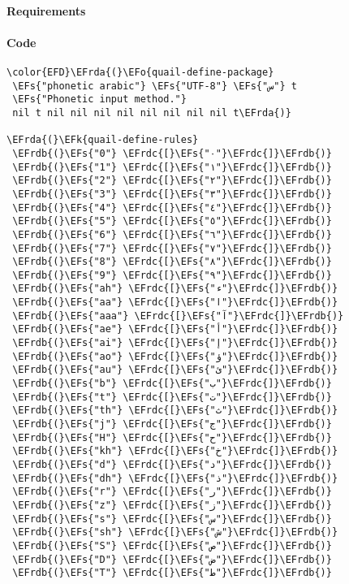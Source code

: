 \documentclass[a4wide,10pt]{article}
\newcommand{\EFs}[1]{\textcolor{EFs}{#1}} %
\newcommand{\EFk}[1]{\textcolor{EFk}{#1}} %
\newcommand{\EFo}[1]{\textcolor{EFo}{#1}} %
\newcommand{\EFrda}[1]{\textcolor{EFrda}{#1}} %
\newcommand{\EFrdb}[1]{\textcolor{EFrdb}{#1}} %
\newcommand{\EFrdc}[1]{\textcolor{EFrdc}{#1}} %
\begin{document}
\paragraph{Requirements}
\label{sec:org575892f}
\paragraph{Code}
\label{sec:org2cb51ba}
\begin{Code}
\begin{Verbatim}
\color{EFD}\EFrda{(}\EFo{quail-define-package}
 \EFs{"phonetic arabic"} \EFs{"UTF-8"} \EFs{"س"} t
 \EFs{"Phonetic input method."}
 nil t nil nil nil nil nil nil nil nil t\EFrda{)}

\EFrda{(}\EFk{quail-define-rules}
 \EFrdb{(}\EFs{"0"} \EFrdc{[}\EFs{"٠"}\EFrdc{]}\EFrdb{)}
 \EFrdb{(}\EFs{"1"} \EFrdc{[}\EFs{"١"}\EFrdc{]}\EFrdb{)}
 \EFrdb{(}\EFs{"2"} \EFrdc{[}\EFs{"٢"}\EFrdc{]}\EFrdb{)}
 \EFrdb{(}\EFs{"3"} \EFrdc{[}\EFs{"٣"}\EFrdc{]}\EFrdb{)}
 \EFrdb{(}\EFs{"4"} \EFrdc{[}\EFs{"٤"}\EFrdc{]}\EFrdb{)}
 \EFrdb{(}\EFs{"5"} \EFrdc{[}\EFs{"٥"}\EFrdc{]}\EFrdb{)}
 \EFrdb{(}\EFs{"6"} \EFrdc{[}\EFs{"٦"}\EFrdc{]}\EFrdb{)}
 \EFrdb{(}\EFs{"7"} \EFrdc{[}\EFs{"٧"}\EFrdc{]}\EFrdb{)}
 \EFrdb{(}\EFs{"8"} \EFrdc{[}\EFs{"٨"}\EFrdc{]}\EFrdb{)}
 \EFrdb{(}\EFs{"9"} \EFrdc{[}\EFs{"٩"}\EFrdc{]}\EFrdb{)}
 \EFrdb{(}\EFs{"ah"} \EFrdc{[}\EFs{"ء"}\EFrdc{]}\EFrdb{)}
 \EFrdb{(}\EFs{"aa"} \EFrdc{[}\EFs{"ا"}\EFrdc{]}\EFrdb{)}
 \EFrdb{(}\EFs{"aaa"} \EFrdc{[}\EFs{"آ"}\EFrdc{]}\EFrdb{)}
 \EFrdb{(}\EFs{"ae"} \EFrdc{[}\EFs{"أ"}\EFrdc{]}\EFrdb{)}
 \EFrdb{(}\EFs{"ai"} \EFrdc{[}\EFs{"إ"}\EFrdc{]}\EFrdb{)}
 \EFrdb{(}\EFs{"ao"} \EFrdc{[}\EFs{"ؤ"}\EFrdc{]}\EFrdb{)}
 \EFrdb{(}\EFs{"au"} \EFrdc{[}\EFs{"ئ"}\EFrdc{]}\EFrdb{)}
 \EFrdb{(}\EFs{"b"} \EFrdc{[}\EFs{"ب"}\EFrdc{]}\EFrdb{)}
 \EFrdb{(}\EFs{"t"} \EFrdc{[}\EFs{"ت"}\EFrdc{]}\EFrdb{)}
 \EFrdb{(}\EFs{"th"} \EFrdc{[}\EFs{"ث"}\EFrdc{]}\EFrdb{)}
 \EFrdb{(}\EFs{"j"} \EFrdc{[}\EFs{"ج"}\EFrdc{]}\EFrdb{)}
 \EFrdb{(}\EFs{"H"} \EFrdc{[}\EFs{"ح"}\EFrdc{]}\EFrdb{)}
 \EFrdb{(}\EFs{"kh"} \EFrdc{[}\EFs{"خ"}\EFrdc{]}\EFrdb{)}
 \EFrdb{(}\EFs{"d"} \EFrdc{[}\EFs{"د"}\EFrdc{]}\EFrdb{)}
 \EFrdb{(}\EFs{"dh"} \EFrdc{[}\EFs{"ذ"}\EFrdc{]}\EFrdb{)}
 \EFrdb{(}\EFs{"r"} \EFrdc{[}\EFs{"ر"}\EFrdc{]}\EFrdb{)}
 \EFrdb{(}\EFs{"z"} \EFrdc{[}\EFs{"ز"}\EFrdc{]}\EFrdb{)}
 \EFrdb{(}\EFs{"s"} \EFrdc{[}\EFs{"س"}\EFrdc{]}\EFrdb{)}
 \EFrdb{(}\EFs{"sh"} \EFrdc{[}\EFs{"ش"}\EFrdc{]}\EFrdb{)}
 \EFrdb{(}\EFs{"S"} \EFrdc{[}\EFs{"ص"}\EFrdc{]}\EFrdb{)}
 \EFrdb{(}\EFs{"D"} \EFrdc{[}\EFs{"ض"}\EFrdc{]}\EFrdb{)}
 \EFrdb{(}\EFs{"T"} \EFrdc{[}\EFs{"ط"}\EFrdc{]}\EFrdb{)}

\end{Verbatim}
\end{Code}
\end{document}

